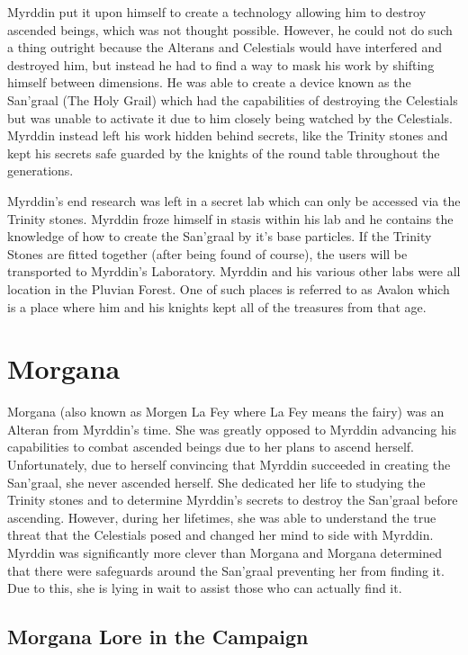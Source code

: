 Myrddin put it upon himself to create a technology allowing him to destroy ascended beings, which was not thought possible. However, he could not do such a thing outright because the Alterans and Celestials would have interfered and destroyed him, but instead he had to find a way to mask his work by shifting himself between dimensions. He was able to create a device known as the San'graal (The Holy Grail) which had the capabilities of destroying the Celestials but was unable to activate it due to him closely being watched by the Celestials. Myrddin instead left his work hidden behind secrets, like the Trinity stones and kept his secrets safe guarded by the knights of the round table throughout the generations.

Myrddin's end research was left in a secret lab which can only be accessed via the Trinity stones. Myrddin froze himself in stasis within his lab and he contains the knowledge of how to create the San'graal by it's base particles. If the Trinity Stones are fitted together (after being found of course), the users will be transported to Myrddin's Laboratory. Myrddin and his various other labs were all location in the Pluvian Forest. One of such places is referred to as Avalon which is a place where him and his knights kept all of the treasures from that age.

\section{Morgana}

Morgana (also known as Morgen La Fey where La Fey means the fairy) was an Alteran from Myrddin's time. She was greatly opposed to Myrddin advancing his capabilities to combat ascended beings due to her plans to ascend herself. Unfortunately, due to herself convincing that Myrddin succeeded in creating the San'graal, she never ascended herself. She dedicated her life to studying the Trinity stones and to determine Myrddin's secrets to destroy the San'graal before ascending. However, during her lifetimes, she was able to understand the true threat that the Celestials posed and changed her mind to side with Myrddin. Myrddin was significantly more clever than Morgana and Morgana determined that there were safeguards around the San'graal preventing her from finding it. Due to this, she is lying in wait to assist those who can actually find it. 

\subsection{Morgana Lore in the Campaign}


